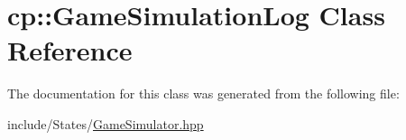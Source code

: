 \hypertarget{classcp_1_1_game_simulation_log}{}\section{cp\+:\+:Game\+Simulation\+Log Class Reference}
\label{classcp_1_1_game_simulation_log}


The documentation for this class was generated from the following file\+:\begin{DoxyCompactItemize}
\item 
include/\+States/\hyperlink{_game_simulator_8hpp}{Game\+Simulator.\+hpp}\end{DoxyCompactItemize}
